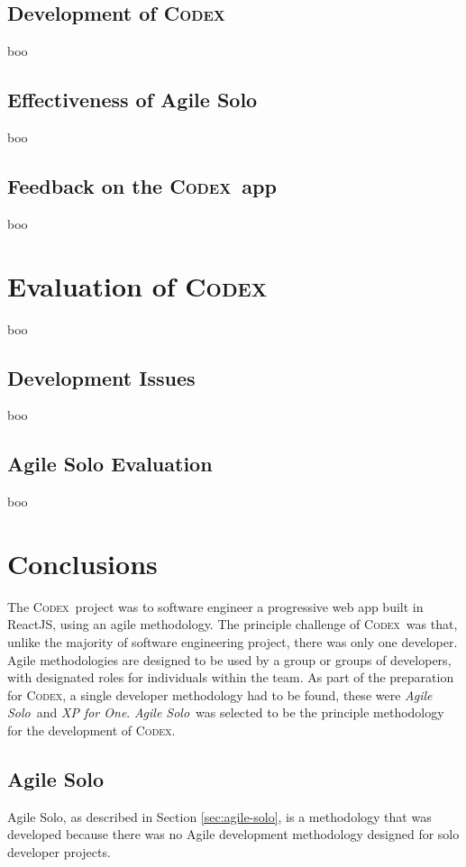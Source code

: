 \documentclass[final]{cmpreport}
\newcommand{\Codex}{\textsc{Codex}}
\newcommand{\AgileSolo}{\emph{Agile Solo}}
\begin{document}
		\subsection{Development of \Codex} \label{sec:codex-development}
		boo
			
		\subsection{Effectiveness of Agile Solo} \label{sec:agile-solo-effect}
		boo	
		
		\subsection{Feedback on the \Codex \ app} \label{sec:feedback}
		boo
		
	\section{Evaluation of \Codex} \label{sec:evaluation}
	boo
	
		\subsection{Development Issues} \label{sec:dev-eval}
		boo
			
		\subsection{Agile Solo Evaluation} \label{sec:agile-solo-eval}
		boo
			
	\section{Conclusions} \label{sec:conclusions}
	The \Codex \ project was to software engineer a progressive web app built in ReactJS, using an agile methodology. The principle challenge of \Codex \ was that, unlike the majority of software engineering project, there was only one developer. Agile methodologies are designed to be used by a group or groups of developers, with designated roles for individuals within the team. As part of the preparation for \Codex, a single developer methodology had to be found, these were \AgileSolo \ and \emph{XP for One}. \AgileSolo \ was selected to be the principle methodology for the development of \Codex. 
	
		\subsection{Agile Solo} \label{sec:agile-solo-conc}
		Agile Solo, as described in Section \ref{sec:agile-solo}, is a methodology that was developed because there was no Agile development methodology designed for solo developer projects.
		
\end{document}
